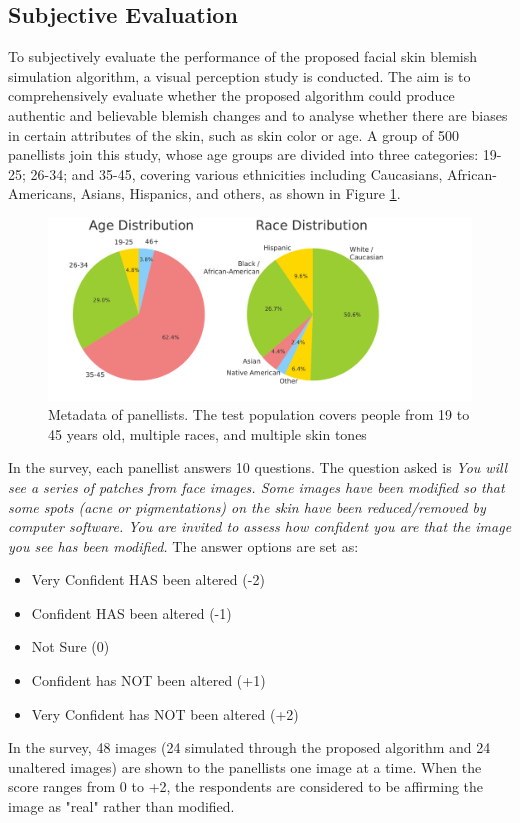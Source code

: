 \begin{spacing}{1.5}
\subsection{Subjective Evaluation}
To subjectively evaluate the performance of the proposed facial skin blemish simulation algorithm, a visual perception study is conducted. The aim is to comprehensively evaluate whether the proposed algorithm could produce authentic and believable blemish changes and to analyse whether there are biases in certain attributes of the skin, such as skin color or age. A group of 500 panellists join this study, whose age groups are divided into three categories: 19-25; 26-34; and 35-45, covering various ethnicities including Caucasians, African-Americans, Asians, Hispanics, and others, as shown in Figure \ref{fig:metadata}.
\begin{figure}[t!]
    \includegraphics[width=0.95\columnwidth]{Chapter4/metadata.pdf}
    \caption{Metadata of panellists. The test population covers people from 19 to 45 years old, multiple races, and multiple skin tones}
    \label{fig:metadata}
\end{figure} 
In the survey, each panellist answers 10 questions. The question asked is \textit{You will see a series of patches from face images. Some images have been modified so that some spots (acne or pigmentations) on the skin have been reduced/removed by computer software. You are invited to assess how confident you are that the image you see has been modified.} The answer options are set as:
\begin{itemize}
    \item Very Confident HAS been altered (-2)
    \item Confident HAS been altered (-1)
    \item Not Sure (0)
    \item Confident has NOT been altered (+1)
    \item Very Confident has NOT been altered (+2)
\end{itemize}

In the survey, 48 images (24 simulated through the proposed algorithm and 24 unaltered images) are shown to the panellists one image at a time. When the score ranges from 0 to +2, the respondents are considered to be affirming the image as "real" rather than modified.

\end{spacing}
\newpage
